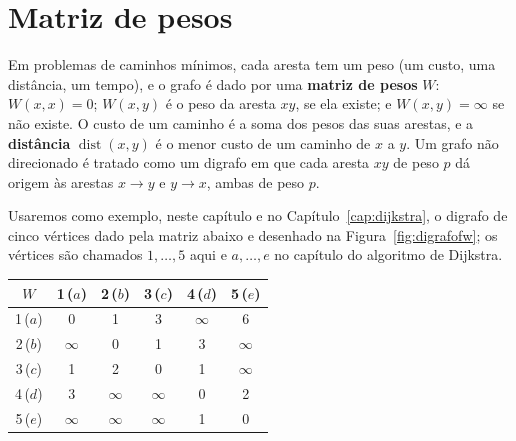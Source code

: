 \section{Matriz de pesos}\label{sec:fwmatriz}
Em problemas de caminhos mínimos, cada aresta tem um peso (um custo, uma distância, um tempo), e o grafo é dado por uma \textbf{matriz de pesos} $W$: $W(x,x)=0$; $W(x,y)$ é o peso da aresta $xy$, se ela existe; e $W(x,y)=\infty$ se não existe. O custo de um caminho é a soma dos pesos das suas arestas, e a \textbf{distância} $\operatorname{dist}(x,y)$ é o menor custo de um caminho de $x$ a $y$. Um grafo não direcionado é tratado como um digrafo em que cada aresta $xy$ de peso $p$ dá origem às arestas $x\to y$ e $y\to x$, ambas de peso $p$.

Usaremos como exemplo, neste capítulo e no Capítulo~\ref{cap:dijkstra}, o digrafo de cinco vértices dado pela matriz abaixo e desenhado na Figura~\ref{fig:digrafofw}; os vértices são chamados $1,\dots,5$ aqui e $a,\dots,e$ no capítulo do algoritmo de Dijkstra.
\begin{center}\small
\begin{tabular}{c|ccccc}
$W$ & 1\,($a$) & 2\,($b$) & 3\,($c$) & 4\,($d$) & 5\,($e$)\\ \hline
1\,($a$) & 0 & 1 & 3 & $\infty$ & 6\\
2\,($b$) & $\infty$ & 0 & 1 & 3 & $\infty$\\
3\,($c$) & 1 & 2 & 0 & 1 & $\infty$\\
4\,($d$) & 3 & $\infty$ & $\infty$ & 0 & 2\\
5\,($e$) & $\infty$ & $\infty$ & $\infty$ & 1 & 0
\end{tabular}
\end{center}

\newcommand{\digrafoFW}[5]{%
  \node[vtx, v1/.try] (n1) at (0,0) {#1};
  \node[vtx, v2/.try] (n2) at (2.4,1.8) {#2};
  \node[vtx, v3/.try] (n3) at (2.4,0) {#3};
  \node[vtx, v4/.try] (n4) at (4.8,0) {#4};
  \node[vtx, v5/.try] (n5) at (2.4,-1.8) {#5};
  \draw[arco, a12/.try] (n1) -- node[peso] {1} (n2);
  \draw[arco, a13/.try] (n1) to[bend left=22] node[peso] {3} (n3);
  \draw[arco, a31/.try] (n3) to[bend left=22] node[peso] {1} (n1);
  \draw[arco, a15/.try] (n1) -- node[peso] {6} (n5);
  \draw[arco, a23/.try] (n2) to[bend left=32] node[peso] {1} (n3);
  \draw[arco, a32/.try] (n3) to[bend left=32] node[peso] {2} (n2);
  \draw[arco, a24/.try] (n2) -- node[peso] {3} (n4);
  \draw[arco, a34/.try] (n3) -- node[peso] {1} (n4);
  \draw[arco, a41/.try] (n4) to[out=-90, in=0] (2.4,-2.8) node[peso] {3} to[out=180, in=-90] (n1);
  \draw[arco, a45/.try] (n4) to[bend left=20] node[peso] {2} (n5);
  \draw[arco, a54/.try] (n5) to[bend left=20] node[peso] {1} (n4);}

